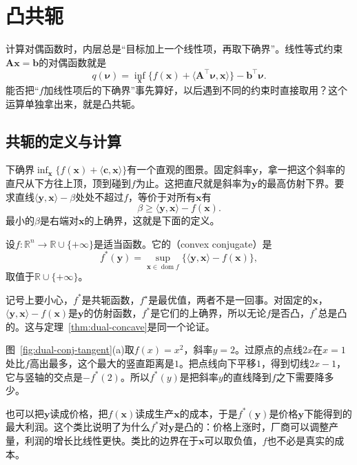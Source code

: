 \section{凸共轭}
\label{sec:dual-conjugate}

计算对偶函数时，内层总是“目标加上一个线性项，再取下确界”。线性等式约束$\bm{A}\bm{x}=\bm{b}$的对偶函数就是
\[
 q(\bm{\nu})=\inf_{\bm{x}}\bigl\{f(\bm{x})+\langle\bm{A}^\top\bm{\nu},\bm{x}\rangle\bigr\}-\bm{b}^\top\bm{\nu}.
\]
能否把“$f$加线性项后的下确界”事先算好，以后遇到不同的约束时直接取用？这个运算单独拿出来，就是凸共轭。

\subsection{共轭的定义与计算}
\label{sec:dual-conjugate-definition}

下确界$\inf_{\bm{x}}\{f(\bm{x})+\langle\bm{c},\bm{x}\rangle\}$有一个直观的图景。固定斜率$\bm{y}$，拿一把这个斜率的直尺从下方往上顶，顶到碰到$f$为止。这把直尺就是斜率为$\bm{y}$的最高仿射下界。要求直线$\langle\bm{y},\bm{x}\rangle-\beta$处处不超过$f$，等价于对所有$\bm{x}$有
\[
 \beta\geq\langle\bm{y},\bm{x}\rangle-f(\bm{x}).
\]
最小的$\beta$是右端对$\bm{x}$的上确界，这就是下面的定义。

\begin{definition}[凸共轭]
 \label{def:dual-conjugate}
 设$f:\mathbb{R}^n\to\mathbb{R}\cup\{+\infty\}$是适当函数。它的（convex conjugate）是
 \begin{equation}
  f^*(\bm{y})=\sup_{\bm{x}\in\operatorname{dom}f}\bigl\{\langle\bm{y},\bm{x}\rangle-f(\bm{x})\bigr\},
  \label{eq:dual-conjugate}
 \end{equation}
 取值于$\mathbb{R}\cup\{+\infty\}$。
\end{definition}

记号上要小心，$f^*$是共轭函数，$f^\star$是最优值，两者不是一回事。对固定的$\bm{x}$，$\langle\bm{y},\bm{x}\rangle-f(\bm{x})$是$\bm{y}$的仿射函数，$f^*$是它们的上确界，所以无论$f$是否凸，$f^*$总是凸的。这与定理~\ref{thm:dual-concave}是同一个论证。

图~\ref{fig:dual-conj-tangent}(a)取$f(x)=x^2$，斜率$y=2$。过原点的点线$2x$在$x=1$处比$f$高出最多，这个最大的竖直距离是$1$。把点线向下平移$1$，得到切线$2x-1$，它与竖轴的交点是$-f^*(2)$。所以$f^*(y)$是把斜率$y$的直线降到$f$之下需要降多少。

也可以把$\bm{y}$读成价格，把$f(\bm{x})$读成生产$\bm{x}$的成本，于是$f^*(\bm{y})$是价格$\bm{y}$下能得到的最大利润。这个类比说明了为什么$f^*$对$\bm{y}$是凸的：价格上涨时，厂商可以调整产量，利润的增长比线性更快。类比的边界在于$\bm{x}$可以取负值，$f$也不必是真实的成本。

